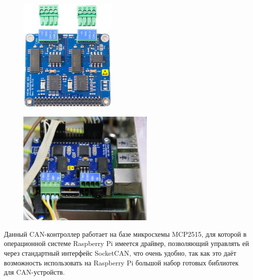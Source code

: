 \documentclass[14pt,russian,a4paper]{extarticle}
\newcounter{subsubsubsection}[subsubsection]
\begin{document}
\begin{figure}[h!]
\centering
\begin{minipage}[t]{180pt}
    \centering
    \includegraphics[height=160pt]{media/pican2duo.png}
    \label{fig:pican}
\end{minipage}%
\hspace{20pt}
\begin{minipage}[t]{180pt}
    \centering
    \includegraphics[height=160pt]{media/pican_mounted.jpg}
    \label{fig:pican_mounted}
\end{minipage}
\end{figure}

Данный CAN-контроллер работает на базе микросхемы MCP2515, для которой в операционной системе Raspberry Pi имеется драйвер, позволяющий управлять ей через стандартный интерфейс SocketCAN, что очень удобно, так как это даёт возможность использовать на Raspberry Pi большой набор готовых библиотек для CAN-устройств.

\end{document}

